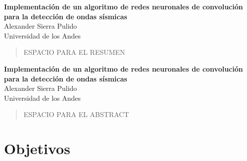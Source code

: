\documentclass[12pt]{report}
\newcommand\blankpage{%
    \null
    \thispagestyle{empty}%
    \addtocounter{page}{-1}%
    \newpage}
\begin{document}


\hspace{0pt}
\begin{center}
    \textbf{{\large Implementación de un algoritmo de redes neuronales de convolución para la detección de ondas sísmicas}}\\
    \vspace{4mm}
     Alexander Sierra Pulido\\
     \vspace{2mm}
    Universidad de los Andes
\begin{minipage}[h]{\textwidth}
\vspace{6mm}
    \begin{abstract}
      ESPACIO PARA EL RESUMEN 
      
    \end{abstract}
\end{minipage}

\end{center}




\thispagestyle{empty}
\clearpage
\pagebreak
\newpage



\hspace{0pt}
\begin{center}
    \textbf{{\large  Implementación de un algoritmo de redes neuronales de convolución para la detección de ondas sísmicas}}\\
    \vspace{4mm}
     Alexander Sierra Pulido\\
     \vspace{2mm}
    Universidad de los Andes
\begin{minipage}[h]{\textwidth}
\vspace{6mm}
    \begin{abstract}
        
        ESPACIO PARA EL ABSTRACT
    

    \end{abstract}
\end{minipage}

\end{center}



\vfill
\hspace{0pt}
\pagebreak
\clearpage
\tableofcontents
\clearpage
\chapter{Objetivos}

\end{document}
